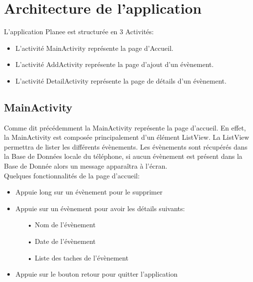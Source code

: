 \documentclass[12pt,a4paper]{report}
\begin{document}
\section{Architecture de l'application}
\begin{flushleft}
\justify
L'application Planee est structurée en 3 Activités:
\begin{itemize}
\item L'activité MainActivity représente la page d'Accueil.
\item L'activité AddActivity représente la page d'ajout d'un évènement.
\item L'activité DetailActivity représente la page de détails d'un évènement.
\end{itemize}
\end{flushleft}
\subsection{MainActivity}
\begin{flushleft}
\justify
Comme dit précédemment la MainActivity représente la page d'accueil. En effet, la MainActivity est composée principalement d'un élément ListView. La ListView permettra de lister les différents évènements. Les évènements sont récupérés dans la Base de Données locale du téléphone, si aucun évènement est présent dans la Base de Donnée alors un message apparaîtra à l'écran.\\

Quelques fonctionnalités de la page d'accueil:
\begin{itemize}
\item Appuie long sur un évènement pour le supprimer
\item Appuie sur un évènement pour avoir les détails suivants:
\begin{itemize}
\item[•] Nom de l'évènement
\item[•] Date de l'évènement
\item[•] Liste des taches de l'évènement
\end{itemize}
\item Appuie sur le bouton retour pour quitter l'application
\end{itemize}
\end{flushleft}
\end{document}
